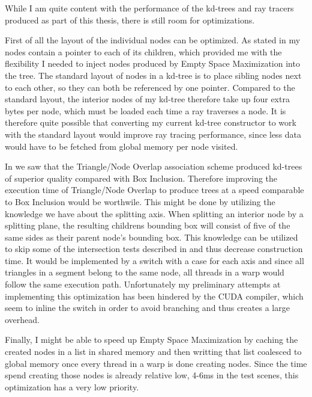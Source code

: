 
While I am quite content with the performance of the kd-trees and ray tracers
produced as part of this thesis, there is still room for optimizations.


First of all the layout of the individual nodes can be optimized. As stated in
 my nodes contain a pointer to each of its
children, which provided me with the flexibility I needed to inject nodes
produced by Empty Space Maximization into the tree. The standard layout of nodes
in a kd-tree is to place sibling nodes next to each other, so they can both be
referenced by one pointer. Compared to the standard layout, the interior nodes
of my kd-tree therefore take up four extra bytes per node, which must be loaded
each time a ray traverses a node. It is therefore quite possible that converting
my current kd-tree constructor to work with the standard layout would improve
ray tracing performance, since less data would have to be fetched from global
memory per node visited.



In  we saw that the Triangle/Node Overlap association
scheme produced kd-trees of superior quality compared with Box
Inclusion. Therefore improving the execution time of Triangle/Node Overlap to
produce trees at a speed comparable to Box Inclusion would be worthwile. This
might be done by utilizing the knowledge we have about the splitting axis. When
splitting an interior node by a splitting plane, the resulting childrens
bounding box will consist of five of the same sides as their parent node's
bounding box. This knowledge can be utilized to skip some of the intersection
tests described in  and thus decrease construction
time. It would be implemented by a switch with a case for each axis and since
all triangles in a segment belong to the same node, all threads in a warp would
follow the same execution path. Unfortunately my preliminary attempts at
implementing this optimization has been hindered by the CUDA compiler, which
seem to inline the switch in order to avoid branching and thus creates a large
overhead.


Finally, I might be able to speed up Empty Space Maximization by caching the
created nodes in a list in shared memory and then writting that list coalesced
to global memory once every thread in a warp is done creating nodes. Since the
time spend creating those nodes is already relative low, 4-6ms in the test
scenes, this optimization has a very low priority.







